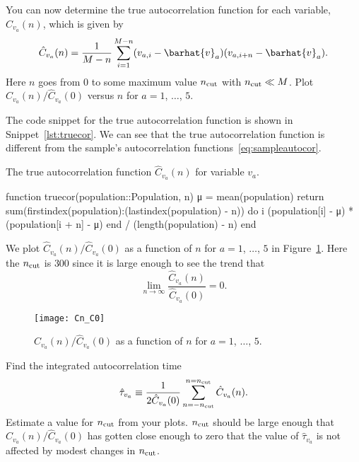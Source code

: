 \Question{} You can now determine the true autocorrelation function for each variable,
\(\hat{C}_{v_a}(n)\), which is given by
%
\begin{equation}
    \hat{C}_{v_a}(n) = \frac{ 1 }{ M - n }
    \sum_{i=1}^{M-n} (v_{a,i} - \barhat{v}_a) (v_{a,i + n} - \barhat{v}_a).
\end{equation}
%
Here \(n\) goes from \(0\) to some maximum value \(n_\textnormal{cut}\) with
\(n_\textnormal{cut} \ll M\).
Plot \(\hat{C}_{v_a}(n) / \hat{C}_{v_a}(0)\) versus \(n\) for \(a = 1\), \(\ldots\), \(5\).

\Answer{}
The code snippet for the true autocorrelation function is shown in Snippet~\ref{lst:truecor}.
We can see that the true autocorrelation function is different from the sample's
autocorrelation functions~\eqref{eq:sampleautocor}.

\begin{algorithm}
    \caption{The true autocorrelation function \(\hat{C}_{v_a}(n)\) for variable \(v_a\).}
    \label{lst:truecor}
    \begin{juliacode}
        function truecor(population::Population, n)
            μ = mean(population)
            return sum(firstindex(population):(lastindex(population) - n)) do i
                (population[i] - μ) * (population[i + n] - μ)
            end / (length(population) - n)
        end
    \end{juliacode}
\end{algorithm}

We plot \(\hat{C}_{v_a}(n) / \hat{C}_{v_a}(0)\) as a function of \(n\) for \(a = 1\), \(\ldots\),
\(5\) in Figure~\ref{fig:truecor}.
Here the \(n_\textnormal{cut}\) is \(300\) since it is large enough to see the trend
that
%
\begin{equation}
    \lim_{n \rightarrow \infty} \frac{ \hat{C}_{v_a}(n) }{ \hat{C}_{v_a}(0) } = 0.
\end{equation}

\begin{figure}[h]
    \centering
    \texttt{[image: Cn\_C0]}
    \caption{\(\hat{C}_{v_a}(n) / \hat{C}_{v_a}(0)\) as a function of \(n\) for
        \(a = 1\), \(\ldots\), \(5\).}
    \label{fig:truecor}
\end{figure}

\Question{} Find the integrated autocorrelation time
%
\begin{equation}\label{eq:tau}
    \hat{\tau}_{v_a} \equiv \frac{ 1 }{ 2 \hat{C}_{v_a}(0) }
    \sum_{n=-n_\textnormal{cut}}^{n=n_\textnormal{cut}} \hat{C}_{v_a}(n).
\end{equation}
%
Estimate a value for \(n_\textnormal{cut}\) from your plots.
\(n_\textnormal{cut}\) should be large enough that \(\hat{C}_{v_a}(n) / \hat{C}_{v_a}(0)\)
has gotten close enough to zero that the value of \(\hat{\tau}_{v_a}\)
is not affected by modest changes in \(n_\textnormal{cut}\).

